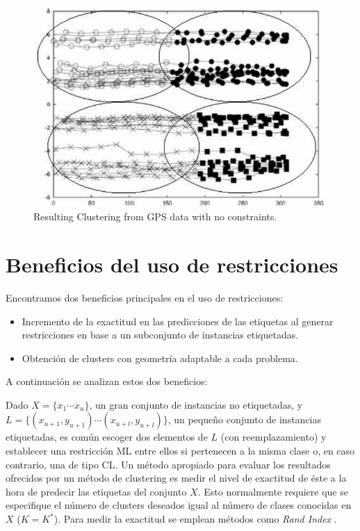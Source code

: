 \begin{figure}[!h]
	\centering
	\includegraphics[scale=0.32]{gfx/ConstClust/GPS/Instancias} 
	\caption[Resulting Clustering from GPS data with no constraints.]{Resulting Clustering from GPS data with no constraints. \cite{davidson2007survey} \cite{wagstaff2001constrained}}\label{fig:figure15}
\end{figure}

\section{Beneficios del uso de restricciones}

Encontramos dos beneficios principales en el uso de restricciones: 

\begin{itemize}
	
	\item Incremento de la exactitud en las predicciones de las etiquetas al generar restricciones en base a un subconjunto de instancias etiquetadas.
	
	\item Obtención de clusters con geometría adaptable a cada problema.
	
\end{itemize}

A continuación se analizan estos dos beneficios:

Dado $X = \{x_1 \cdots x_u\}$, un gran conjunto de instancias no etiquetadas, y $L = \{(x_{u+1}, y_{u+1})\cdots (x_{u+l}, y_{u+l})\}$, un pequeño conjunto de instancias etiquetadas, es común escoger dos elementos de $L$ (con reemplazamiento) y establecer una restricción \acs{ML} entre ellos si pertenecen a la misma clase o, en caso contrario, una de tipo \acs{CL}. Un método apropiado para evaluar los resultados ofrecidos por un método de clustering es medir el nivel de exactitud de éste a la hora de predecir las etiquetas del conjunto $X$. Esto normalmente requiere que se especifique el número de clusters deseados igual al número de clases conocidas en $X$ ($K = K^*$). Para medir la exactitud se emplean métodos como \textit{Rand Index} \cite{rand1971objective}.

